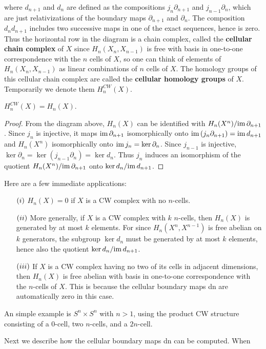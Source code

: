 where $d_{n+1}$ and $d_n$ are defined as the compositions $j_n\partial_{n+1}$ and $j_{n-1}\partial_n$, which are just relativizations of the boundary maps $\partial_{n+1}$ and $\partial_n$. The composition $d_nd_{n+1}$ includes two successive maps in one of the exact sequences, hence is zero. Thus the horizontal row in the diagram is a chain complex, called the \textbf{cellular chain complex} of $X$ since $H_n(X_n,X_{n-1})$ is free with basis in one-to-one correspondence with the $n$ cells of $X$, so one can think of elements of $H_n(X_n,X_{n-1})$ as linear combinations of $n$ cells of $X$. The homology groups of this cellular chain complex are called the \textbf{cellular homology groups} of $X$. Temporarily we denote them $H^{CW}_n(X)$.
\begin{theorem}
$H^{CW}_n(X)=H_n(X)$.
\end{theorem}
\begin{proof}
From the diagram above, $H_n(X)$ can be identified with $H_n(X^n)/\mathrm{im}\,\partial_{n+1}$. Since $j_n$ is injective, it maps $\mathrm{im}\,\partial_{n+1}$ isomorphically onto $\mathrm{im}\,(j_n\partial_{n+1})=\mathrm{im}\, d_{n+1}$ and $H_n(X^n)$ isomorphically onto $\mathrm{im}\, j_n=\mathrm{ker}\,\partial_n$. Since $j_{n-1}$ is injective, $\ker\partial_n=\ker(j_{n-1}\partial_n)=\ker d_n$. Thus $j_n$ induces an isomorphism of the quotient $H_n(X^n)/\mathrm{im}\,\partial_{n+1}$ onto $\mathrm{ker}\, d_n/\mathrm{im}\, d_{n+1}$.
\end{proof}
Here are a few immediate applications:
\begin{itemize}
\item[$(\rmnum{1})$]$H_n(X)=0$ if $X$ is a CW complex with no $n$-cells.
\item[$(\rmnum{2})$]More generally, if $X$ is a CW complex with $k$ $n$-cells, then $H_n(X)$ is generated by at most $k$ elements. For since $H_n(X^n,X^{n-1})$ is free abelian on $k$ generators, the subgroup $\ker d_n$ must be generated by at most $k$ elements, hence also the quotient $\mathrm{ker}\, d_n/\mathrm{im}\, d_{n+1}$.
\item[$(\rmnum{3})$]If $X$ is a CW complex having no two of its cells in adjacent dimensions, then $H_n(X)$ is free abelian with basis in one-to-one correspondence with the $n$-cells of $X$. This is because the cellular boundary maps dn are automatically zero in this case.
\end{itemize}
An simple example is $S^n\times S^n$ with $n>1$, using the product CW structure consisting of a $0$-cell, two $n$-cells, and a $2n$-cell.\par
Next we describe how the cellular boundary maps dn can be computed. When
